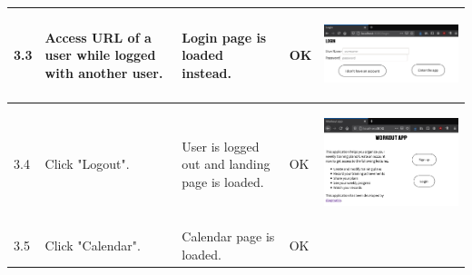 \documentclass[12pt,twoside,titlepage,a4paper]{article}
\theoremstyle{definicion}
\theoremstyle{lema}
\theoremstyle{teorema}
\theoremstyle{corolario}
\theoremstyle{ejemplo}
\theoremstyle{nota}
\begin{document}
\begin{table}[!ht]
\begin{tabular}{|m{0.6cm}|m{2.9cm}|m{3.6cm}|m{1.1cm}|m{5.9cm}|}
		\hline
		3.3 & Access URL of a user while logged with another user. & Login page is loaded instead. & OK &
		\begin{center}\includegraphics[scale=0.24]{register2-login1.png}\end{center} \\
		\hline
		3.4 & Click "Logout". & User is logged out and landing page is loaded. & OK &
		\begin{center}\includegraphics[scale=0.24]{landingpage.png}\end{center} \\
		\hline
		3.5 & Click "Calendar". & Calendar page is loaded. & OK &

\end{tabular}
\end{table}
\end{document}
